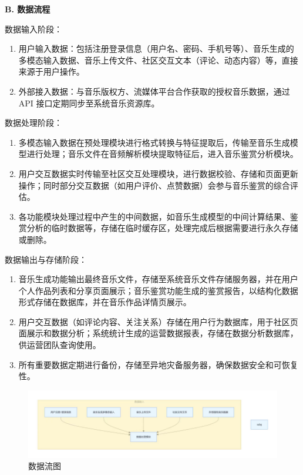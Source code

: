 \documentclass{base}
\begin{document}
\textbf{B. 数据流程}

数据输入阶段：

\begin{enumerate}
    \item 用户输入数据：包括注册登录信息（用户名、密码、手机号等）、音乐生成的多模态输入数据、音乐上传文件、社区交互文本（评论、动态内容）等，直接来源于用户操作。​
    \item 外部接入数据：与音乐版权方、流媒体平台合作获取的授权音乐数据，通过 API 接口定期同步至系统音乐资源库。
\end{enumerate}

数据处理阶段：

\begin{enumerate}
    \item 多模态输入数据在预处理模块进行格式转换与特征提取后，传输至音乐生成模型进行处理；音乐文件在音频解析模块提取特征后，进入音乐鉴赏分析模块。​
    \item 用户交互数据实时传输至社区交互处理模块，进行数据校验、存储和页面更新操作；同时部分交互数据（如用户评价、点赞数据）会参与音乐鉴赏的综合评估。​
    \item 各功能模块处理过程中产生的中间数据，如音乐生成模型的中间计算结果、鉴赏分析的临时数据等，存储在临时缓存区，处理完成后根据需要进行永久存储或删除。
\end{enumerate}

数据输出与存储阶段：

\begin{enumerate}
    \item 音乐生成功能输出最终音乐文件，存储至系统音乐文件存储服务器，并在用户个人作品列表和分享页面展示；音乐鉴赏功能生成的鉴赏报告，以结构化数据形式存储在数据库，并在音乐作品详情页展示。
    \item 用户交互数据（如评论内容、关注关系）存储在用户行为数据库，用于社区页面展示和数据分析；系统统计生成的运营数据报表，存储在数据分析数据库，供运营团队查询使用。​
    \item 所有重要数据定期进行备份，存储至异地灾备服务器，确保数据安全和可恢复性。
\end{enumerate}

\begin{figure}[H]
    \centering
    \includegraphics[width=\textwidth]{images/1-1.png}
    \caption{数据流图}
\end{figure}
\end{document}

